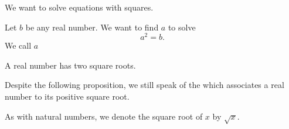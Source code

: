 


We want to solve equations
with squares.

Let $b$ be any real
number.
We want to find $a$
to solve
\[
  a^2 = b.
\]
We call $a$

\begin{prop}
A real number has two square
roots.
\end{prop}

Despite the following proposition,
we still speak of the
which associates a real number to
its positive square root.


As with natural numbers, we denote
the square root of $x$ by $\sqrt{x}$.
